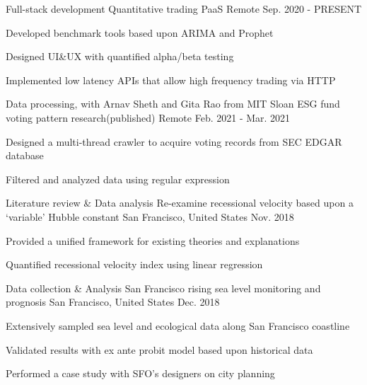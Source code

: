\begin{cventries}
  \cventry
    {Full-stack development}
    {Quantitative trading PaaS}
    {Remote}
    {Sep. 2020 - PRESENT}
    {
      \begin{cvitems}
        \item {Developed benchmark tools based upon ARIMA and Prophet}
        \item {Designed UI\&UX with quantified alpha/beta testing}
        \item {Implemented low latency APIs that allow high frequency trading via HTTP}
      \end{cvitems}
    }

  \cventry
    {Data processing, with Arnav Sheth and Gita Rao from MIT Sloan}
    {ESG fund voting pattern research(published)}
    {Remote}
    {Feb. 2021 - Mar. 2021}
    {
      \begin{cvitems}
        \item {Designed a multi-thread crawler to acquire voting records from SEC EDGAR database}
        \item {Filtered and analyzed data using regular expression}
      \end{cvitems}
    }

  \cventry
    {Literature review \& Data analysis}
    {Re-examine recessional velocity based upon a `variable' Hubble constant}
    {San Francisco, United States}
    {Nov. 2018}
    {
      \begin{cvitems}
        \item {Provided a unified framework for existing theories and explanations}
        \item {Quantified recessional velocity index using linear regression}
      \end{cvitems}
    }

  \cventry
    {Data collection \& Analysis}
    {San Francisco rising sea level monitoring and prognosis}
    {San Francisco, United States}
    {Dec. 2018}
    {
      \begin{cvitems}
        \item {Extensively sampled sea level and ecological data along San Francisco coastline}
        \item {Validated results with ex ante probit model based upon historical data}
        \item {Performed a case study with SFO's designers on city planning}
      \end{cvitems}
    }
\end{cventries}
